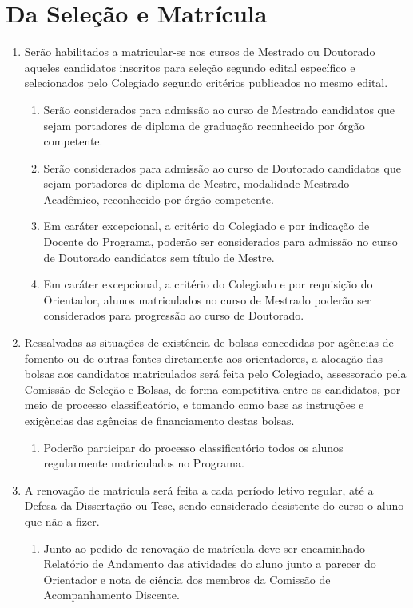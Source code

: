 \documentclass{article}
\newcommand{\singleitem}{\item[Parágrafo Único.]}
\newcommand{\grupoMenor}{Colegiado\xspace}
\begin{document}
\section{Da Seleção e Matrícula}
\begin{enumerate}
	\item Serão habilitados a matricular-se nos cursos de Mestrado ou Doutorado aqueles candidatos inscritos para seleção segundo edital específico e selecionados pelo \grupoMenor segundo critérios publicados no mesmo edital.

	\begin{enumerate}

		\item Serão considerados para admissão ao curso de Mestrado candidatos que sejam portadores de diploma de graduação reconhecido por órgão competente.

		\item Serão considerados para admissão ao curso de Doutorado candidatos que sejam portadores de diploma de Mestre, modalidade Mestrado Acadêmico, reconhecido por órgão competente.

		\item Em caráter excepcional, a critério do \grupoMenor e por indicação de Docente do Programa, poderão ser considerados para admissão no curso de Doutorado candidatos sem título de Mestre.
	
		\item Em caráter excepcional, a critério do \grupoMenor e por requisição do Orientador, alunos matriculados no curso de Mestrado poderão ser considerados para progressão ao curso de Doutorado.
	\end{enumerate}

	\item Ressalvadas as situações de existência de bolsas concedidas por agências de fomento ou de outras fontes diretamente aos orientadores, a alocação das bolsas aos candidatos matriculados será feita pelo \grupoMenor, assessorado pela Comissão de Seleção e Bolsas, de forma competitiva entre os candidatos, por meio de processo classificatório, e tomando como base as instruções e exigências das agências de financiamento destas bolsas.
	\begin{enumerate}
		\item Poderão participar do processo classificatório todos os alunos regularmente matriculados no Programa.
	\end{enumerate}
	
	\item A renovação de matrícula será feita a cada período letivo regular, até a Defesa da Dissertação ou Tese, sendo considerado desistente do curso o aluno que não a fizer.
	\begin{enumerate}
		\singleitem Junto ao pedido de renovação de matrícula deve ser encaminhado Relatório de Andamento das atividades do aluno junto a parecer do Orientador e nota de ciência dos membros da Comissão de Acompanhamento Discente.
	\end{enumerate}


\end{enumerate}
\end{document}

